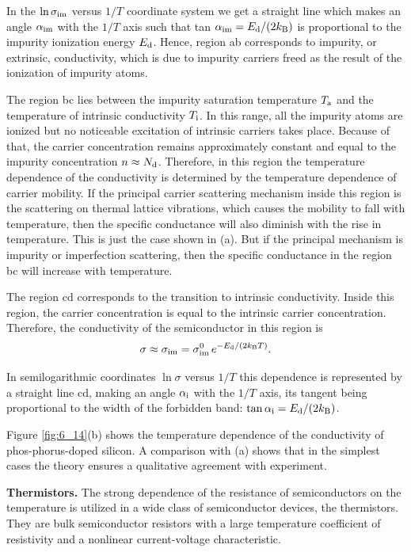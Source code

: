 \noindent
In the $\ln{\sigma_{\text{im}}}$ versus $1/T$ coordinate system we get a straight line which makes an angle $\alpha_{\text{im}}$ with the $1/T$ axis such that tan $\alpha_{\text{im}}=E_{\text{d}}/(2k_{\text{B}})$ is proportional to the impurity ionization energy $E_{\text{d}}$. Hence, region ab corresponds to impurity, or extrinsic, conductivity, which is due to impurity carriers freed as the result of the ionization of impurity atoms.

The region bc lies between the impurity saturation temperature $T_{\text{a}}$ and the temperature of intrinsic conductivity $T_{\text{i}}$. In this range, all the impurity atoms are ionized but no noticeable excitation of intrinsic carriers takes place. Because of that, the carrier concentration remains approximately constant and equal to the impurity concentration $n\approx N_{\text{d}}$. Therefore, in this region the temperature dependence of the conductivity is determined by the temperature dependence of carrier mobility. If the principal carrier scattering mechanism inside this region is the scattering on thermal lattice vibrations, which causes the mobility to fall with temperature, then the specific conductance will also diminish with the rise in temperature. This is just the case shown in (a). But if the principal mechanism is impurity or imperfection scattering, then the specific conductance in the region bc will increase with temperature.

The region cd corresponds to the transition to intrinsic conductivity. Inside this region, the carrier concentration is equal to the intrinsic carrier concentration. Therefore, the conductivity of the semiconductor in this region is
\begin{equation*}
	\sigma \approx \sigma_{\text{im}} = \sigma_{\text{im}}^0\, e^{-E_{\text{d}}/(2k_{\text{B}}T)}.
\end{equation*}

\noindent
In semilogarithmic coordinates $\ln{\sigma}$ versus $1/T$ this dependence is represented by a straight line cd, making an angle $\alpha_{\text{i}}$ with the $1/T$ axis, its tangent being proportional to the width of the forbidden band: $\tan\alpha_{\text{i}}=E_{\text{d}}/(2k_{\text{B}})$.

Figure \ref{fig:6_14}(b) shows the temperature dependence of the conductivity of phos-phorus-doped silicon. A comparison with (a) shows that in the simplest cases the theory ensures a qualitative agreement with experiment.

\textbf{Thermistors.} The strong dependence of the resistance of semiconductors on the temperature is utilized in a wide class of semiconductor devices, the thermistors. They are bulk semiconductor resistors with a large temperature coefficient of resistivity and a nonlinear current-voltage characteristic.

